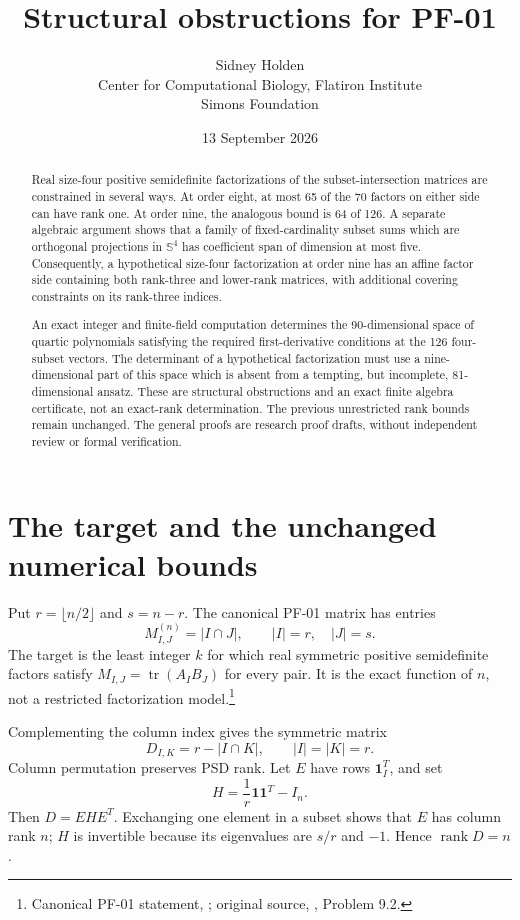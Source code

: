 \documentclass[11pt]{article}
\title{Structural obstructions for PF-01}
\author{Sidney Holden\\{\small Center for Computational Biology, Flatiron Institute}\\{\small Simons Foundation}}\date{13 September 2026}
\theoremstyle{remark}\newtheorem{remark}[theorem]{Remark}
\newcommand{\Sym}{\mathbb S}
\newcommand{\tr}{\operatorname{tr}}
\newcommand{\rank}{\operatorname{rank}}
\newcommand{\one}{\mathbf 1}
\begin{document}
\maketitle

\begin{abstract}
Real size-four positive semidefinite factorizations of the subset-intersection matrices are constrained in several ways. At order eight, at most 65 of the 70 factors on either side can have rank one. At order nine, the analogous bound is 64 of 126. A separate algebraic argument shows that a family of fixed-cardinality subset sums which are orthogonal projections in $\Sym^4$ has coefficient span of dimension at most five. Consequently, a hypothetical size-four factorization at order nine has an affine factor side containing both rank-three and lower-rank matrices, with additional covering constraints on its rank-three indices.

An exact integer and finite-field computation determines the 90-dimensional space of quartic polynomials satisfying the required first-derivative conditions at the 126 four-subset vectors. The determinant of a hypothetical factorization must use a nine-dimensional part of this space which is absent from a tempting, but incomplete, 81-dimensional ansatz. These are structural obstructions and an exact finite algebra certificate, not an exact-rank determination. The previous unrestricted rank bounds remain unchanged. The general proofs are research proof drafts, without independent review or formal verification.
\end{abstract}

\section{The target and the unchanged numerical bounds}
Put $r=\lfloor n/2\rfloor$ and $s=n-r$. The canonical PF-01 matrix has entries
\[
 M^{(n)}_{I,J}=|I\cap J|,\qquad |I|=r,\quad |J|=s.
\]
The target is the least integer $k$ for which real symmetric positive semidefinite factors satisfy $M_{I,J}=\tr(A_I B_J)$ for every pair. It is the exact function of $n$, not a restricted factorization model.\footnote{Canonical PF-01 statement, \cite{repo}; original source, \cite{fawzi}, Problem 9.2.}

Complementing the column index gives the symmetric matrix
\begin{equation}\label{eq:D}
 D_{I,K}=r-|I\cap K|,\qquad |I|=|K|=r.
\end{equation}
Column permutation preserves PSD rank. Let $E$ have rows $\one_I^T$, and set
\[
 H=\frac1r\one\one^T-I_n.
\]
Then $D=EHE^T$. Exchanging one element in a subset shows that $E$ has column rank $n$; $H$ is invertible because its eigenvalues are $s/r$ and $-1$. Hence $\rank D=n$.
\end{document}
